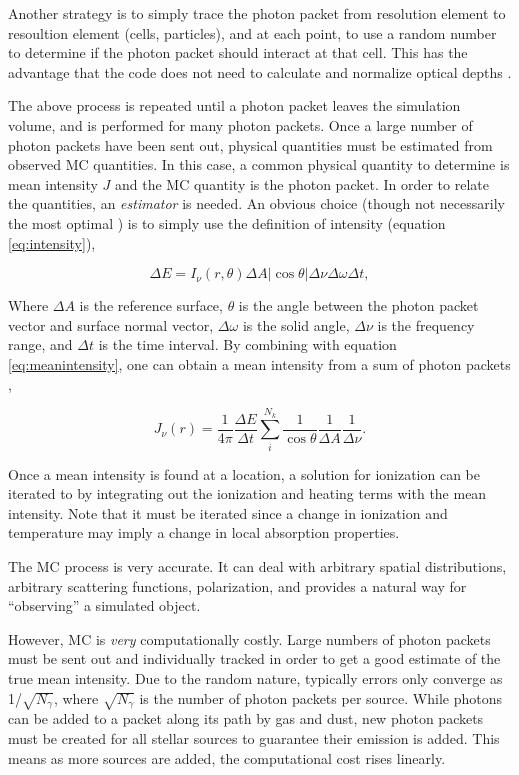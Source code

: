 Another strategy is to simply trace the photon packet from resolution element to resoultion element (cells, particles), and at each point, to use a random number to determine if the photon packet should interact at that cell. This has the advantage that the code does not need to calculate and normalize optical depths \citep{lucy99,ercolanoEt03}.

The above process is repeated until a photon packet leaves the simulation volume, and is performed for many photon packets. Once a large number of photon packets have been sent out, physical quantities must be estimated from observed MC quantities. In this case, a common physical quantity to determine is mean intensity $J$ and the MC quantity is the photon packet. In order to relate the quantities, an \emph{estimator} is needed. An obvious choice (though not necessarily the most optimal \citep{ercolanoEt03}) is to simply use the definition of intensity (equation \ref{eq:intensity}),

\begin{equation}
\label{eq:mcstimator}
\Delta E = I_{\nu}(r,\theta)\Delta A |\cos{\theta}|\Delta \nu \Delta \omega \Delta t,
\end{equation}

Where $\Delta A$ is the reference surface, $\theta$ is the angle between the photon packet vector and surface normal vector, $\Delta \omega$ is the solid angle, $\Delta \nu$ is the frequency range, and $\Delta t$ is the time interval. By combining with equation \ref{eq:meanintensity}, one can obtain a mean intensity from a sum of photon packets \citep{ercolanoEt03},

\begin{equation}
\label{eq:mcmeanintensity}
J_{\nu}(r) = \frac{1}{4\pi}\frac{\Delta E}{\Delta t} \sum_i^{N_k} \frac{1}{\cos{\theta}}\frac{1}{\Delta A}\frac{1}{\Delta \nu}.
\end{equation}

Once a mean intensity is found at a location, a solution for ionization can be iterated to by integrating out the ionization and heating terms with the mean intensity. Note that it must be iterated since a change in ionization and temperature may imply a change in local absorption properties.

The MC process is very accurate. It can deal with arbitrary spatial distributions, arbitrary scattering functions, polarization, and provides a natural way for ``observing'' a simulated object.

However, MC is \emph{very} computationally costly. Large numbers of photon packets must be sent out and individually tracked in order to get a good estimate of the true mean intensity. Due to the random nature, typically errors only converge as 1/$\sqrt{N_{\gamma}}$, where $\sqrt{N_{\gamma}}$ is the number of photon packets per source. While photons can be added to a packet along its path by gas and dust, new photon packets must be created for all stellar sources to guarantee their emission is added. This means as more sources are added, the computational cost rises linearly.

